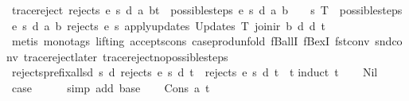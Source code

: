 \begin{isabellebody}
\ trace{\isacharunderscore}reject{\isacharunderscore}{}{\isacharcolon}\ {\isachardoublequoteopen}{\isacharparenleft}rejects\ e\ s\ d\ {\isacharparenleft}{\isacharparenleft}a{\isacharcomma}\ b{\isacharparenright}{\isacharhash}t{\isacharparenright}{\isacharparenright}\ {\isacharequal}\ {\isacharparenleft}possible{\isacharunderscore}steps\ e\ s\ d\ a\ b\ {\isacharequal}\ {\isacharbraceleft}{\isacharbar}{\isacharbar}{\isacharbraceright}\ {\isasymor}\ {\isacharparenleft}{\isasymforall}{\isacharparenleft}s{\isacharprime}{\isacharcomma}\ T{\isacharparenright}\ {\isacharbar}{\isasymin}{\isacharbar}\ possible{\isacharunderscore}steps\ e\ s\ d\ a\ b{\isachardot}\ rejects\ e\ s{\isacharprime}\ {\isacharparenleft}apply{\isacharunderscore}updates\ {\isacharparenleft}Updates\ T{\isacharparenright}\ {\isacharparenleft}join{\isacharunderscore}ir\ b\ d{\isacharparenright}\ d{\isacharparenright}\ t{\isacharparenright}{\isacharparenright}{\isachardoublequoteclose}\isanewline
%
\isadelimproof
\ \ %
\endisadelimproof
%
\isatagproof
{}\isamarkupfalse%
\ {\isacharparenleft}metis\ {\isacharparenleft}mono{\isacharunderscore}tags{\isacharcomma}\ lifting{\isacharparenright}\ accepts{\isacharunderscore}cons\ case{\isacharunderscore}prod{\isacharunderscore}unfold\ fBallI\ fBexI\ fst{\isacharunderscore}conv\ snd{\isacharunderscore}conv\ trace{\isacharunderscore}reject{\isacharunderscore}later\ trace{\isacharunderscore}reject{\isacharunderscore}no{\isacharunderscore}possible{\isacharunderscore}steps{\isacharparenright}%
\endisatagproof
{\isafoldproof}%
%
\isadelimproof
\isanewline
%
\endisadelimproof
\isanewline
{}\isamarkupfalse%
\ rejects{\isacharunderscore}prefix{\isacharunderscore}all{\isacharunderscore}s{\isacharunderscore}d{\isacharcolon}\ {\isachardoublequoteopen}{\isasymforall}s\ d{\isachardot}\ rejects\ e\ s\ d\ t\ {\isasymlongrightarrow}\ rejects\ e\ s\ d\ {\isacharparenleft}t\ {\isacharat}\ t{\isacharprime}{\isacharparenright}{\isachardoublequoteclose}\isanewline
%
\isadelimproof
%
\endisadelimproof
%
\isatagproof
{}\isamarkupfalse%
{\isacharparenleft}induct\ t{\isacharparenright}\isanewline
\ \ \isamarkupfalse%
\ Nil\isanewline
\ \ \isamarkupfalse%
\ \isamarkupfalse%
\ {\isacharquery}case\isanewline
\ \ \ \ \isamarkupfalse%
\ {\isacharparenleft}simp\ add{\isacharcolon}\ base{\isacharparenright}\isanewline
{}\isamarkupfalse%
\isanewline
\ \ \isamarkupfalse%
\ {\isacharparenleft}Cons\ a\ t{\isacharparenright}\isanewline
\ \ \isamarkupfalse%

\end{isabellebody}
